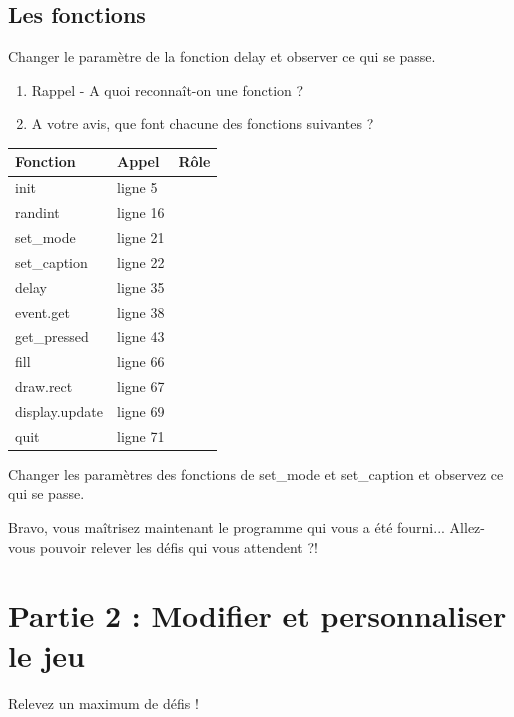 \subsection*{Les fonctions}
\begin{Avous}
Changer le paramètre de la fonction delay et observer ce qui se passe.
\end{Avous}

\begin{enumerate}[resume=globalList]
\item Rappel - A quoi reconnaît-on une fonction ?
\item  A votre avis, que font chacune des fonctions suivantes ?
\end{enumerate}
\begin{table}[!ht]
    \centering
    \begin{tabular}{|l|l|p{8cm}|}
    \hline
        Fonction & Appel & Rôle \\ \hline
        init & ligne 5 & \\ \hline
        randint & ligne 16 & \\ \hline
        set\_mode & ligne 21 & \\ \hline
        set\_caption & ligne 22 & \\ \hline
        delay & ligne 35 & \\ \hline
        event.get & ligne 38 & \\ \hline
        get\_pressed & ligne 43 & \\ \hline
        fill & ligne 66 & \\ \hline
        draw.rect & ligne 67  & \\ \hline
        display.update & ligne 69 & \\ \hline
        quit & ligne 71 & \\ \hline
    \end{tabular}
\end{table}
\begin{Avous}
    Changer les paramètres des fonctions de set\_mode et set\_caption et observez ce qui se passe.
\end{Avous}

Bravo, vous maîtrisez maintenant le programme qui vous a été fourni... Allez-vous pouvoir relever les défis qui vous attendent ?!

\newpage

\section*{Partie 2 : Modifier et personnaliser le jeu}
\begin{center}
\begin{minipage}{0.5\textwidth}

    \begin{Objectif}
        \centering
        Relevez un maximum de défis !
    \end{Objectif}
\end{minipage}
    \end{center}


